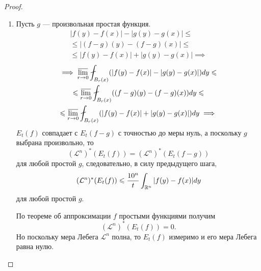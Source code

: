 \begin{proof}
\begin{enumerate}
    Сначала докажем, что
    \[(\mathcal{L}^n)^* (E_t(f))=0 \quad \forall t > 0.\]
    Этого будет достаточно, поскольку
    \[\left\{x \in \R^n \ | \ \uplim\limits_{r\to 0} \fint_{B_r(x)}|f(y) - f(x)|dy > 0\right\} \subset \bigcup\limits_{n=1}^{\infty}E_{\frac{1}{n}}(f).\]
    \[\forall r > 0:
    \fint_{B_r(x)}|f(y) - f(x)| dy
    \leqslant
    |f(x)| + \fint_{B_r(x)}|f(y)|dy
    \leqslant
    |f(x)| + M[f](x)
    \implies\]
    \[\implies E_t(f) \subset
    \underbrace{\left\{x \in \R^n \ | \ |f(x)| > \frac{t}{2}\right\}}_{E_{t,1}(f)}
    \cup
    \underbrace{\left\{x \in \R^n \ | \ M[f](x) > \frac{t}{2}\right\}}_{E_{t,2}(f)}\]
    По неравенству Чебышёва:
    \[\mathcal{L}^n(E_{t,1}(f)) \leqslant \frac{2}{t} \int_{\R^n} |f(y)| dy,\]
    \[\mathcal{L}^n(E_{t,2}(f)) \leqslant \frac{2 \cdot 5^n}{t} \int_{\R^n} |f(y)|dy \implies\]
    \[\implies (\mathcal{L}^n)^*(E_t(f)) \leqslant \mathcal{L}^n(E_{t,1}(f)) + \mathcal{L}^n(E_{t,2}(f)) \leqslant \frac{10^n}{t} \int_{\R^n} |f(y)| dy.\]
    \item Пусть $g$ — произвольная простая функция.
    \begin{multline*}
    |f(y) - f(x)| - |g(y) - g(x)|
    \leqslant\\\leqslant
    |(f-g)(y) - (f-g)(x)|
    \leqslant\\\leqslant
    |f(y) - f(x)| + |g(y) - g(x)| 
    \implies
    \end{multline*}
    \begin{multline*}
    \implies \uplim\limits_{r\to0} \fint_{B_r(x)}(|f(y)-f(x)| - |g(y) - g(x)|) dy 
    \leqslant\\\leqslant
    \uplim\limits_{r\to0} \fint_{B_r(x)} ((f-g)(y) - (f-g)(x)) dy
    \leqslant\\\leqslant
    \uplim\limits_{r\to0} \fint_{B_r(x)}(|f(y)-f(x)| + |g(y)-g(x)|)dy
    \implies
    \end{multline*} 
    $E_t(f)$ совпадает с $E_t(f-g)$ с точностью до меры нуль, а поскольку $g$ выбрана произвольно, то
    \[(\mathcal{L}^n)^*(E_t(f)) = (\mathcal{L}^n)^*(E_t(f-g))\]
    для любой простой $g$, следовательно, в силу предыдущего шага,
    \[(\mathcal{L}^n)^*(E_t(f)) \leqslant \frac{10^n}{t} \int_{\mathbb{R}^n} |f(y)-f(x)|dy\]
    для любой простой $g$.
    
    По теореме об аппроксимации $f$ простыми функциями получим
    \[(\mathcal{L}^n)^*(E_t(f)) = 0.\]
    Но поскольку мера Лебега $\mathcal{L}^n$ полна, то $E_t(f)$ измеримо и его мера Лебега равна нулю.
    

\end{enumerate}
\end{proof} 